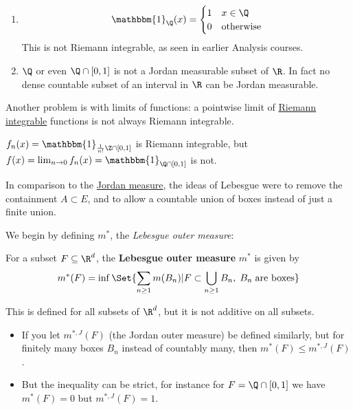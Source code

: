\documentclass{article}
\newcommand{\1}[1]{\mathbbm{1}_{#1}}
\begin{document}
\begin{eg}
    \leavevmode
    \begin{enumerate}[label=(\roman*)]
        \item
            \begin{equation*}
                \1{\Q}(x) = \begin{cases}
                    1 & x \in \Q \\
                    0 & \text{otherwise}
                \end{cases}
             \end{equation*}
            This is not Riemann integrable, as seen in earlier Analysis courses.
        \item $\Q$ or even $\Q \cap [0, 1]$ is not a Jordan measurable subset of $\R$.
            In fact no dense countable subset of an interval in $\R$ can be Jordan measurable.
    \end{enumerate}
\end{eg}

Another problem is with limits of functions: a pointwise limit of \hyperlink{def:riemannIntegrable}{Riemann integrable} functions is not always Riemann integrable.
\begin{eg}
    $f_n(x) = \1{\frac1{n!}\Z \cap [0, 1]}$ is Riemann integrable, but $f(x) = \lim_{n \to 0} f_n(x) = \1{\Q \cap [0, 1]}$ is not.
\end{eg}

In comparison to the \hyperlink{def:jMeasure}{Jordan measure}, the ideas of Lebesgue were to remove the containment $A \subset E$, and to allow a countable union of boxes instead of just a finite union.

We begin by defining $m^*$, the \emph{Lebesgue outer measure}:
\begin{defi}
    For a subset $F \subseteq \R^d$, the \textbf{Lebesgue outer measure} $m^*$ is given by
    \begin{equation*}
        m^*(F) = \inf\Set{\sum_{n \geq 1} m(B_n) | F \subset \bigcup_{n \geq 1} B_n, \; B_n \; \text{are boxes}}
    \end{equation*}
\end{defi}

This is defined for all subsets of $\R^d$, but it is not additive on all subsets.
\begin{remark}
    \leavevmode
    \begin{itemize}
        \item If you let $m^{*, J}(F)$ (the Jordan outer measure) be defined similarly, but for finitely many boxes $B_n$ instead of countably many, then $m^*(F) \leq m^{*, J}(F)$.
        \item But the inequality can be strict, for instance for $F = \Q \cap [0, 1]$ we have $m^*(F) = 0$ but $m^{*, J}(F) = 1$.
    \end{itemize}
\end{remark}
\end{document}
